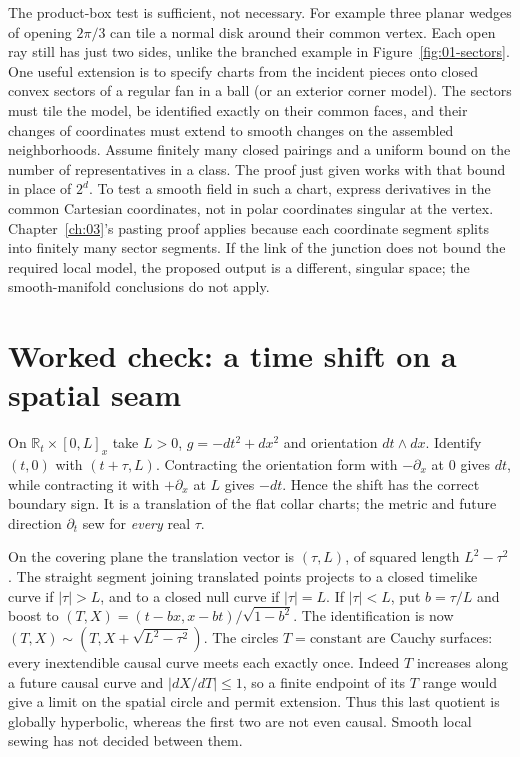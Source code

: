 The product-box test is sufficient, not necessary. For example three planar wedges of opening $2\pi/3$ can tile a normal disk around their common vertex. Each open ray still has just two sides, unlike the branched example in Figure~\ref{fig:01-sectors}. One useful extension is to specify charts from the incident pieces onto closed convex sectors of a regular fan in a ball (or an exterior corner model). The sectors must tile the model, be identified exactly on their common faces, and their changes of coordinates must extend to smooth changes on the assembled neighborhoods. Assume finitely many closed pairings and a uniform bound on the number of representatives in a class. The proof just given works with that bound in place of $2^d$. To test a smooth field in such a chart, express derivatives in the common Cartesian coordinates, not in polar coordinates singular at the vertex. Chapter~\ref{ch:03}'s pasting proof applies because each coordinate segment splits into finitely many sector segments. If the link of the junction does not bound the required local model, the proposed output is a different, singular space; the smooth-manifold conclusions do not apply.

\section{Worked check: a time shift on a spatial seam}

On $\mathbb R_t\times[0,L]_x$ take $L>0$, $g=-dt^2+dx^2$ and orientation $dt\wedge dx$. Identify $(t,0)$ with $(t+\tau,L)$. Contracting the orientation form with $-\partial_x$ at $0$ gives $dt$, while contracting it with $+\partial_x$ at $L$ gives $-dt$. Hence the shift has the correct boundary sign. It is a translation of the flat collar charts; the metric and future direction $\partial_t$ sew for \emph{every} real $\tau$.

On the covering plane the translation vector is $(\tau,L)$, of squared length $L^2-\tau^2$. The straight segment joining translated points projects to a closed timelike curve if $|\tau|>L$, and to a closed null curve if $|\tau|=L$. If $|\tau|<L$, put $b=\tau/L$ and boost to $(T,X)=(t-bx,x-bt)/\sqrt{1-b^2}$. The identification is now $(T,X)\sim(T,X+\sqrt{L^2-\tau^2})$. The circles $T=\mathrm{constant}$ are Cauchy surfaces: every inextendible causal curve meets each exactly once. Indeed $T$ increases along a future causal curve and $|dX/dT|\leq1$, so a finite endpoint of its $T$ range would give a limit on the spatial circle and permit extension. Thus this last quotient is globally hyperbolic, whereas the first two are not even causal. Smooth local sewing has not decided between them.

